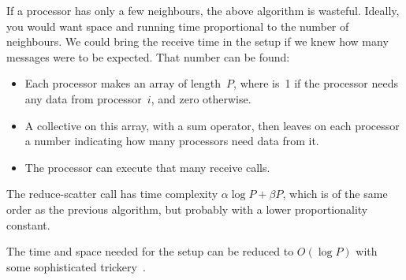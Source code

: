 If a processor has only a few neighbours, the above algorithm is wasteful. 
Ideally, you would want space and running time proportional to the number of neighbours.
We could bring the receive time in the setup if we knew how many messages
were to be expected. That number can be found:
\begin{itemize}
\item Each processor makes an array  of length~$P$, where 
  is~1 if the processor needs any data from processor~$i$, and zero otherwise.
\item A  collective on this array, with a
  sum operator, then leaves on each processor a number indicating how
  many processors need data from it.
\item The processor can execute that many receive calls.
\end{itemize}
The reduce-scatter call has time complexity $\alpha\log P+\beta P$,
which is of the same order as the previous algorithm, but 
probably with a lower proportionality constant.

The time and space needed for the setup can be reduced to $O(\log P)$ with some
sophisticated trickery~\cite{Falgout:scalable-hypre,Hoefler:2010:SCP}.

